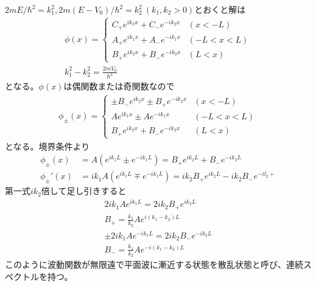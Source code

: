     $2mE / \hbar^2 = k_1^2, 2m(E - V_0) / \hbar^2 = k_2^2 \ (k_1, k_2 > 0)$とおくと解は
    \begin{gather*}
        \phi(x) = 
        \begin{cases}
            C_+ e^{ik_2x} + C_- e^{- ik_2x} & (x < -L)\\
            A_+ e^{ik_1x} + A_- e^{- ik_1x} & (-L < x < L)\\
            B_+ e^{ik_2x} + B_- e^{- ik_2x} & (L < x)
        \end{cases}\\
        k_1^2 - k_2^2 = \frac{2mV_0}{\hbar^2}
    \end{gather*}
    となる。$\phi(x)$は偶関数または奇関数なので
    \begin{gather*}
        \phi_\pm(x) = 
        \begin{cases}
            \pm B_- e^{ik_2x} \pm B_+ e^{- ik_2x} & (x < -L)\\
            A e^{ik_1x} \pm A e^{- ik_1x} & (-L < x < L)\\
            B_+ e^{ik_2x} + B_- e^{- ik_2x} & (L < x)
        \end{cases}
    \end{gather*}
    となる。境界条件より
    \begin{align*}
        \phi_\pm(x) &= A (e^{ik_1L} \pm e^{-ik_1L}) = B_+ e^{ik_2L} + B_- e^{-ik_2L}\\
        \phi_\pm'(x) &= ik_1 A (e^{ik_1L} \mp e^{-ik_1L}) = ik_2 B_+ e^{ik_2L} - ik_2 B_- e^{-il_2+}
    \end{align*}
    第一式$ik_2$倍して足し引きすると
    \begin{align*}
        2 ik_1 A e^{ik_1L} = 2 ik_2 B_+ e^{ik_2L}\\
        B_+ = \frac{k_1}{k_2} A e^{i(k_1 - k_2)L}\\
        \pm 2 ik_1 A e^{-ik_1L} = 2 ik_2 B_- e^{-ik_2L}\\
        B_- = \frac{k_1}{k_2} A e^{-i(k_1 - k_2)L}
    \end{align*}
    このように波動関数が無限遠で平面波に漸近する状態を散乱状態と呼び、連続スペクトルを持つ。
